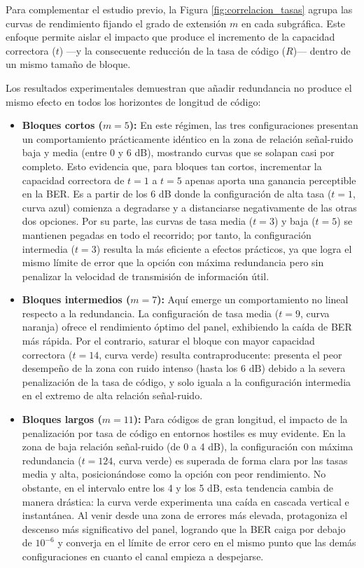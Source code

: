 Para complementar el estudio previo, la Figura \ref{fig:correlacion_tasas} agrupa las curvas de rendimiento fijando el grado de extensión $m$ en cada subgráfica. Este enfoque permite aislar el impacto que produce el incremento de la capacidad correctora ($t$) —y la consecuente reducción de la tasa de código ($R$)— dentro de un mismo tamaño de bloque.

Los resultados experimentales demuestran que añadir redundancia no produce el mismo efecto en todos los horizontes de longitud de código:

\begin{itemize}

    \item \textbf{Bloques cortos ($m=5$):}  
    En este régimen, las tres configuraciones presentan un comportamiento prácticamente idéntico en la zona de relación señal-ruido baja y media (entre 0 y 6 dB), mostrando curvas que se solapan casi por completo. Esto evidencia que, para bloques tan cortos, incrementar la capacidad correctora de $t=1$ a $t=5$ apenas aporta una ganancia perceptible en la BER. Es a partir de los 6 dB donde la configuración de alta tasa ($t=1$, curva azul) comienza a degradarse y a distanciarse negativamente de las otras dos opciones. Por su parte, las curvas de tasa media ($t=3$) y baja ($t=5$) se mantienen pegadas en todo el recorrido; por tanto, la configuración intermedia ($t=3$) resulta la más eficiente a efectos prácticos, ya que logra el mismo límite de error que la opción con máxima redundancia pero sin penalizar la velocidad de transmisión de información útil.

    \item \textbf{Bloques intermedios ($m=7$):}  
    Aquí emerge un comportamiento no lineal respecto a la redundancia. La configuración de tasa media ($t=9$, curva naranja) ofrece el rendimiento óptimo del panel, exhibiendo la caída de BER más rápida. Por el contrario, saturar el bloque con mayor capacidad correctora ($t=14$, curva verde) resulta contraproducente: presenta el peor desempeño de la zona con ruido intenso (hasta los $6 \text{ dB}$) debido a la severa penalización de la tasa de código, y solo iguala a la configuración intermedia en el extremo de alta relación señal-ruido.

    \item \textbf{Bloques largos ($m=11$):}  
    Para códigos de gran longitud, el impacto de la penalización por tasa de código en entornos hostiles es muy evidente. En la zona de baja relación señal-ruido (de 0 a 4 dB), la configuración con máxima redundancia ($t=124$, curva verde) es superada de forma clara por las tasas media y alta, posicionándose como la opción con peor rendimiento. No obstante, en el intervalo entre los 4 y los 5 dB, esta tendencia cambia de manera drástica: la curva verde experimenta una caída en cascada vertical e instantánea. Al venir desde una zona de errores más elevada, protagoniza el descenso más significativo del panel, logrando que la BER caiga por debajo de $10^{-6}$ y converja en el límite de error cero en el mismo punto que las demás configuraciones en cuanto el canal empieza a despejarse.    
    
\end{itemize}

